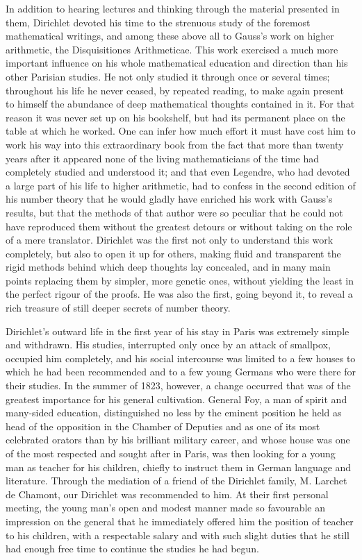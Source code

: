 \documentclass[11pt]{article}
\begin{document}
In addition to hearing lectures and thinking through the material presented in them, Dirichlet devoted his time to the strenuous study of the foremost mathematical writings, and among these above all to Gauss's work on higher arithmetic, the Disquisitiones Arithmeticae. This work exercised a much more important influence on his whole mathematical education and direction than his other Parisian studies. He not only studied it through once or several times; throughout his life he never ceased, by repeated reading, to make again present to himself the abundance of deep mathematical thoughts contained in it. For that reason it was never set up on his bookshelf, but had its permanent place on the table at which he worked. One can infer how much effort it must have cost him to work his way into this extraordinary book from the fact that more than twenty years after it appeared none of the living mathematicians of the time had completely studied and understood it; and that even Legendre, who had devoted a large part of his life to higher arithmetic, had to confess in the second edition of his number theory that he would gladly have enriched his work with Gauss's results, but that the methods of that author were so peculiar that he could not have reproduced them without the greatest detours or without taking on the role of a mere translator. Dirichlet was the first not only to understand this work completely, but also to open it up for others, making fluid and transparent the rigid methods behind which deep thoughts lay concealed, and in many main points replacing them by simpler, more genetic ones, without yielding the least in the perfect rigour of the proofs. He was also the first, going beyond it, to reveal a rich treasure of still deeper secrets of number theory.

Dirichlet's outward life in the first year of his stay in Paris was extremely simple and withdrawn. His studies, interrupted only once by an attack of smallpox, occupied him completely, and his social intercourse was limited to a few houses to which he had been recommended and to a few young Germans who were there for their studies. In the summer of 1823, however, a change occurred that was of the greatest importance for his general cultivation. General Foy, a man of spirit and many-sided education, distinguished no less by the eminent position he held as head of the opposition in the Chamber of Deputies and as one of its most celebrated orators than by his brilliant military career, and whose house was one of the most respected and sought after in Paris, was then looking for a young man as teacher for his children, chiefly to instruct them in German language and literature. Through the mediation of a friend of the Dirichlet family, M. Larchet de Chamont, our Dirichlet was recommended to him. At their first personal meeting, the young man's open and modest manner made so favourable an impression on the general that he immediately offered him the position of teacher to his children, with a respectable salary and with such slight duties that he still had enough free time to continue the studies he had begun.
\end{document}

